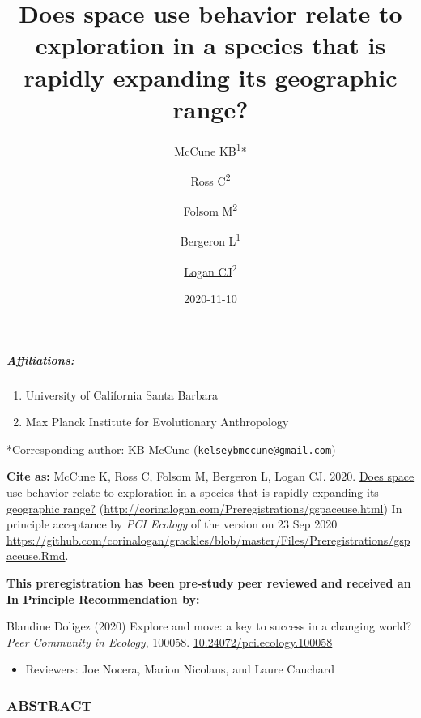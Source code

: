 \documentclass[
]{article}
\title{Does space use behavior relate to exploration in a species that is
rapidly expanding its geographic range?}
\author{\href{https://www.kelseymccune.com/}{McCune KB}\textsuperscript{1}* \and Ross C\textsuperscript{2} \and Folsom M\textsuperscript{2} \and Bergeron L\textsuperscript{1} \and \href{http://CorinaLogan.com}{Logan CJ}\textsuperscript{2}}
\date{2020-11-10}
\providecommand{\tightlist}{%
  \setlength{\itemsep}{0pt}\setlength{\parskip}{0pt}}
\begin{document}
\maketitle

\hypertarget{affiliations}{%
\subparagraph{Affiliations:}\label{affiliations}}

\begin{enumerate}
\def\labelenumi{\arabic{enumi})}
\tightlist
\item
  University of California Santa Barbara
\item
  Max Planck Institute for Evolutionary Anthropology
\end{enumerate}

*Corresponding author: KB McCune
(\href{mailto:kelseybmccune@gmail.com}{\nolinkurl{kelseybmccune@gmail.com}})

\textbf{Cite as:} McCune K, Ross C, Folsom M, Bergeron L, Logan CJ.
2020. \href{http://corinalogan.com/Preregistrations/gspaceuse.html}{Does
space use behavior relate to exploration in a species that is rapidly
expanding its geographic range?}
(\url{http://corinalogan.com/Preregistrations/gspaceuse.html}) In
principle acceptance by \emph{PCI Ecology} of the version on 23 Sep 2020
\url{https://github.com/corinalogan/grackles/blob/master/Files/Preregistrations/gspaceuse.Rmd}.

\textbf{This preregistration has been pre-study peer reviewed and
received an In Principle Recommendation by:}

Blandine Doligez (2020) Explore and move: a key to success in a changing
world? \emph{Peer Community in Ecology}, 100058.
\href{https://doi.org/10.24072/pci.ecology.100058}{10.24072/pci.ecology.100058}

\begin{itemize}
\tightlist
\item
  Reviewers: Joe Nocera, Marion Nicolaus, and Laure Cauchard
\end{itemize}

\hypertarget{abstract}{%
\subsubsection{ABSTRACT}\label{abstract}}
\end{document}
